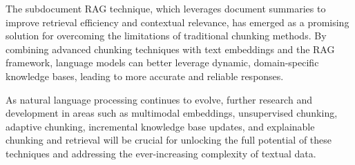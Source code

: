 \documentclass[
  letterpaper,
  DIV=11,
  numbers=noendperiod]{scrartcl}
\begin{document}
The subdocument RAG technique, which leverages document summaries to
improve retrieval efficiency and contextual relevance, has emerged as a
promising solution for overcoming the limitations of traditional
chunking methods. By combining advanced chunking techniques with text
embeddings and the RAG framework, language models can better leverage
dynamic, domain-specific knowledge bases, leading to more accurate and
reliable responses.

As natural language processing continues to evolve, further research and
development in areas such as multimodal embeddings, unsupervised
chunking, adaptive chunking, incremental knowledge base updates, and
explainable chunking and retrieval will be crucial for unlocking the
full potential of these techniques and addressing the ever-increasing
complexity of textual data.
\end{document}
